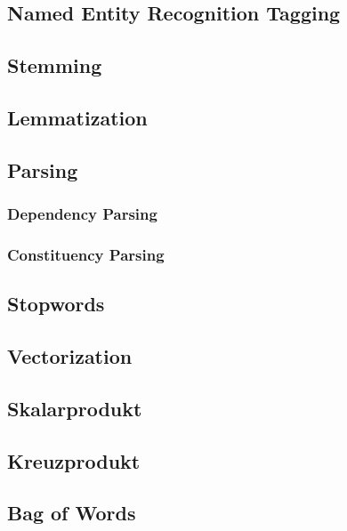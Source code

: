 \subsection{Named Entity Recognition Tagging}


\subsection{Stemming}


\subsection{Lemmatization}


\subsection{Parsing}


\subsubsection{Dependency Parsing}


\subsubsection{Constituency Parsing}


\subsection{Stopwords}


\subsection{Vectorization}


\subsection{Skalarprodukt}

\subsection{Kreuzprodukt}


\subsection{Bag of Words}


